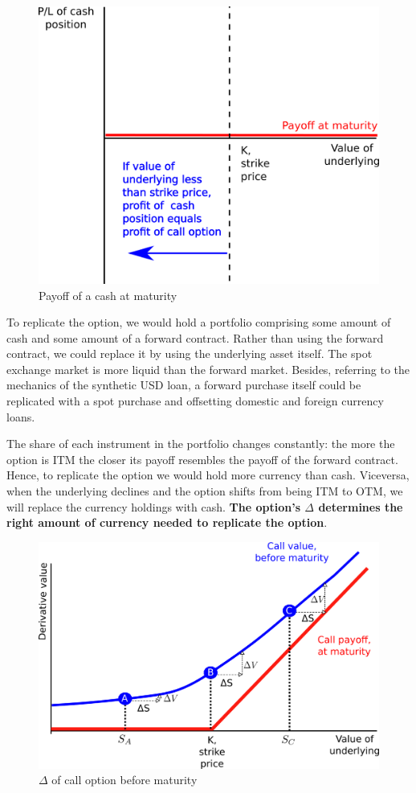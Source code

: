 \documentclass[]{book}
\theoremstyle{definition}
\theoremstyle{definition}
\theoremstyle{definition}
\theoremstyle{remark}
\begin{document}
\begin{figure}
\includegraphics[width=0.6\linewidth]{images/figCashPosition} \caption{Payoff of a cash at maturity}\label{fig:unnamed-chunk-24}
\end{figure}

To replicate the option, we would hold a portfolio comprising some
amount of cash and some amount of a forward contract. Rather than using
the forward contract, we could replace it by using the underlying asset
itself. The spot exchange market is more liquid than the forward market.
Besides, referring to the mechanics of the synthetic USD loan, a forward
purchase itself could be replicated with a spot purchase and offsetting
domestic and foreign currency loans.

The share of each instrument in the portfolio changes constantly: the
more the option is ITM the closer its payoff resembles the payoff of the
forward contract. Hence, to replicate the option we would hold more
currency than cash. Viceversa, when the underlying declines and the
option shifts from being ITM to OTM, we will replace the currency
holdings with cash. \textbf{The option's \(\Delta\) determines the right
amount of currency needed to replicate the option}.

\begin{figure}
\includegraphics[width=0.7\linewidth]{images/figCallOption} \caption{$\Delta$ of call option before maturity}\label{fig:unnamed-chunk-25}
\end{figure}
\end{document}
